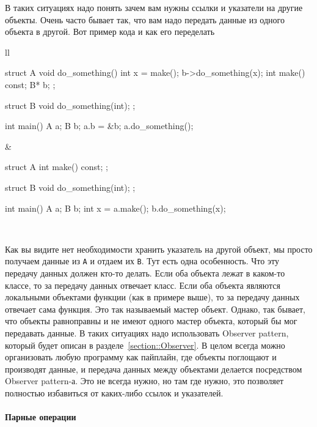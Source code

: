 В таких ситуациях надо понять зачем вам нужны ссылки и указатели на другие объекты.
Очень часто бывает так, что вам надо передать данные из одного объекта в другой.
Вот пример кода и как его переделать
\begin{center}
\begin{tabular}{ll}
{
\begin{minipage}[\baselineskip]{8cm}
\begin{cppcode}[numbers = none]
struct A {
  void do_something() {
    int x = make();
    b->do_something(x);
  }
  int make() const;
  B* b;
};

struct B {
  void do_something(int);
};

int main() {
  A a;
  B b;
  a.b = &b;
  a.do_something();  
}
\end{cppcode}
\end{minipage}
}&{
\begin{minipage}[\baselineskip]{8cm}
\begin{cppcode}[numbers = none]
struct A {
  int make() const;
};

struct B {
  void do_something(int);
};






int main() {
  A a;
  B b;
  int x = a.make();
  b.do_something(x);
}
\end{cppcode}
\end{minipage}
}\\
\end{tabular}
\end{center}
Как вы видите нет необходимости хранить указатель на другой объект, мы просто получаем данные из \verb"A" и отдаем их \verb"B".
Тут есть одна особенность.
Что эту передачу данных должен кто-то делать.
Если оба объекта лежат в каком-то классе, то за передачу данных отвечает класс.
Если оба объекта являются локальными объектами функции (как в примере выше), то за передачу данных отвечает сама функция.
Это так называемый мастер объект.
Однако, так бывает, что объекты равноправны и не имеют одного мастер объекта, который бы мог передавать данные.
В таких ситуациях надо использовать Observer pattern, который будет описан в разделе~\ref{section::Observer}.
В целом всегда можно организовать любую программу как пайплайн, где объекты поглощают и производят данные, и передача данных между объектами делается посредством Observer pattern-а.
Это не всегда нужно, но там где нужно, это позволяет полностью избавиться от каких-либо ссылок и указателей.

\paragraph{Парные операции}

